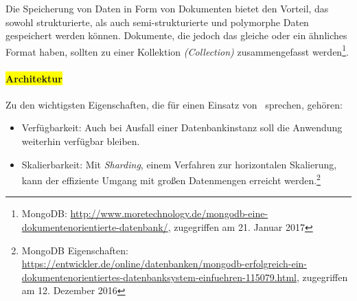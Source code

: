 Die Speicherung von Daten in Form von Dokumenten bietet den Vorteil, das sowohl strukturierte, als auch semi-strukturierte und polymorphe Daten gespeichert werden können. Dokumente, die jedoch das gleiche oder ein ähnliches Format haben, sollten zu einer Kollektion \textit{(Collection)} zusammengefasst werden\footnote{MongoDB: \url{http://www.moretechnology.de/mongodb-eine-dokumentenorientierte-datenbank/}, zugegriffen am 21. Januar 2017}.

\paragraph{\colorbox{yellow}{Architektur}}

Zu den wichtigsten Eigenschaften, die für einen Einsatz von \mongo\ sprechen, gehören:
\begin{itemize}
\item Verfügbarkeit: Auch bei Ausfall einer Datenbankinstanz soll die Anwendung weiterhin verfügbar bleiben.
\item Skalierbarkeit: Mit \textit{Sharding}, einem Verfahren zur horizontalen Skalierung, kann der effiziente Umgang mit großen Datenmengen erreicht werden.\footnote{MongoDB Eigenschaften: \url{https://entwickler.de/online/datenbanken/mongodb-erfolgreich-ein-dokumentenorientiertes-datenbanksystem-einfuehren-115079.html}, zugegriffen am 12. Dezember 2016}
\end{itemize}



